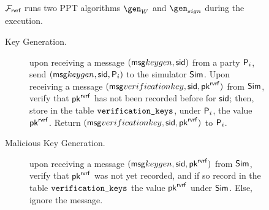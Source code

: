 \begin{figure}
	\scriptsize 
	\begin{tcolorbox}
		{  $ \mathcal{F}_{\textsf{rvrf}} $ runs two PPT algorithms $ \gen_W$ and $\gen_{sign} $ during the execution.
			
			\begin{description}
				
				\item[Key Generation.] upon receiving a message $(\mathsf{msg}{keygen}, \textsf{sid})$ from a party $\mathsf{P}_i$, send $(\mathsf{msg}{keygen}, \textsf{sid}, \mathsf{P}_i)$ to the simulator $\mathsf{Sim}$.
				Upon receiving a message $(\mathsf{msg}{verificationkey}, \textsf{sid}, \mathsf{pk}^{\mathsf{rvrf}})$ from $\mathsf{Sim}$, verify that $\mathsf{pk}^{\mathsf{rvrf}}$ has not been recorded before for $ \textsf{sid} $; then, store in the table $\texttt{verification\_keys}$, under $\mathsf{P}_i$, the value $\mathsf{pk}^{\mathsf{rvrf}}$.
				Return $(\mathsf{msg}{verificationkey}, \textsf{sid}, \mathsf{pk}^{\mathsf{rvrf}})$ to $ \mathsf{P}_i$.
				
				\item[Malicious Key Generation.] upon receiving a message $(\mathsf{msg}{keygen}, \textsf{sid}, \mathsf{pk}^{\mathsf{rvrf}})$ from $\mathsf{Sim}$, verify that $\mathsf{pk}^{\mathsf{rvrf}}$ was not yet recorded, and if so record in the table $\texttt{verification\_keys}$ the value $\mathsf{pk}^{\mathsf{rvrf}}$ under $\mathsf{Sim}$. Else, ignore the message.
				

\end{description}}
\end{tcolorbox}
\end{figure}
